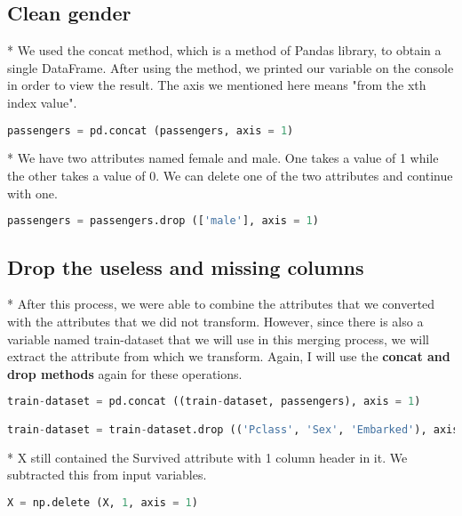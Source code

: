 \documentclass[onecolumn]{article}
\begin{document}
\subsection{Clean gender}

* We used the concat method, which is a method of Pandas library, to obtain a single DataFrame. After using the method, we printed our variable on the console in order to view the result. The axis we mentioned here means "from the xth index value".

\begin{lstlisting}[language=Python, caption= concat passengers] 
passengers = pd.concat (passengers, axis = 1)
\end{lstlisting}


* We have two attributes named female and male. One takes a value of 1 while the other takes a value of 0. We can delete one of the two attributes and continue with one.

\begin{lstlisting}[language=Python, caption= drop male] 
passengers = passengers.drop (['male'], axis = 1)
\end{lstlisting}

\subsection{Drop the useless and missing columns}

* After this process, we were able to combine the attributes that we converted with the attributes that we did not transform. However, since there is also a variable named train-dataset that we will use in this merging process, we will extract the attribute from which we transform. Again, I will use the\textbf{ concat and drop methods} again for these operations.

\begin{lstlisting}[language=Python, caption= drop the useless and missing columns] 
train-dataset = pd.concat ((train-dataset, passengers), axis = 1)

train-dataset = train-dataset.drop (('Pclass', 'Sex', 'Embarked'), axis = 1)
\end{lstlisting}

* X still contained the Survived attribute with 1 column header in it. We subtracted this from input variables.

\begin{lstlisting}[language=Python, caption= concat] 
X = np.delete (X, 1, axis = 1)
\end{lstlisting}
\end{document}
